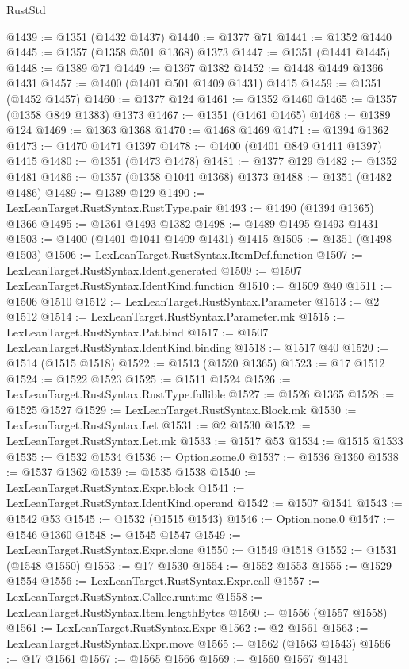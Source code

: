 \begin{lexlean}{RustStd}
\begin{coremodule}
@1439 := @1351 (@1432 @1437)
@1440 := @1377 @71
@1441 := @1352 @1440
@1445 := @1357 (@1358 @501 @1368) @1373
@1447 := @1351 (@1441 @1445)
@1448 := @1389 @71
@1449 := @1367 @1382
@1452 := @1448 @1449 @1366 @1431
@1457 := @1400 (@1401 @501 @1409 @1431) @1415
@1459 := @1351 (@1452 @1457)
@1460 := @1377 @124
@1461 := @1352 @1460
@1465 := @1357 (@1358 @849 @1383) @1373
@1467 := @1351 (@1461 @1465)
@1468 := @1389 @124
@1469 := @1363 @1368
@1470 := @1468 @1469
@1471 := @1394 @1362
@1473 := @1470 @1471 @1397
@1478 := @1400 (@1401 @849 @1411 @1397) @1415
@1480 := @1351 (@1473 @1478)
@1481 := @1377 @129
@1482 := @1352 @1481
@1486 := @1357 (@1358 @1041 @1368) @1373
@1488 := @1351 (@1482 @1486)
@1489 := @1389 @129
@1490 := LexLeanTarget.RustSyntax.RustType.pair
@1493 := @1490 (@1394 @1365) @1366
@1495 := @1361 @1493 @1382
@1498 := @1489 @1495 @1493 @1431
@1503 := @1400 (@1401 @1041 @1409 @1431) @1415
@1505 := @1351 (@1498 @1503)
@1506 := LexLeanTarget.RustSyntax.ItemDef.function
@1507 := LexLeanTarget.RustSyntax.Ident.generated
@1509 := @1507 LexLeanTarget.RustSyntax.IdentKind.function
@1510 := @1509 @40
@1511 := @1506 @1510
@1512 := LexLeanTarget.RustSyntax.Parameter
@1513 := @2 @1512
@1514 := LexLeanTarget.RustSyntax.Parameter.mk
@1515 := LexLeanTarget.RustSyntax.Pat.bind
@1517 := @1507 LexLeanTarget.RustSyntax.IdentKind.binding
@1518 := @1517 @40
@1520 := @1514 (@1515 @1518)
@1522 := @1513 (@1520 @1365)
@1523 := @17 @1512
@1524 := @1522 @1523
@1525 := @1511 @1524
@1526 := LexLeanTarget.RustSyntax.RustType.fallible
@1527 := @1526 @1365
@1528 := @1525 @1527
@1529 := LexLeanTarget.RustSyntax.Block.mk
@1530 := LexLeanTarget.RustSyntax.Let
@1531 := @2 @1530
@1532 := LexLeanTarget.RustSyntax.Let.mk
@1533 := @1517 @53
@1534 := @1515 @1533
@1535 := @1532 @1534
@1536 := Option.some.{0}
@1537 := @1536 @1360
@1538 := @1537 @1362
@1539 := @1535 @1538
@1540 := LexLeanTarget.RustSyntax.Expr.block
@1541 := LexLeanTarget.RustSyntax.IdentKind.operand
@1542 := @1507 @1541
@1543 := @1542 @53
@1545 := @1532 (@1515 @1543)
@1546 := Option.none.{0}
@1547 := @1546 @1360
@1548 := @1545 @1547
@1549 := LexLeanTarget.RustSyntax.Expr.clone
@1550 := @1549 @1518
@1552 := @1531 (@1548 @1550)
@1553 := @17 @1530
@1554 := @1552 @1553
@1555 := @1529 @1554
@1556 := LexLeanTarget.RustSyntax.Expr.call
@1557 := LexLeanTarget.RustSyntax.Callee.runtime
@1558 := LexLeanTarget.RustSyntax.Item.lengthBytes
@1560 := @1556 (@1557 @1558)
@1561 := LexLeanTarget.RustSyntax.Expr
@1562 := @2 @1561
@1563 := LexLeanTarget.RustSyntax.Expr.move
@1565 := @1562 (@1563 @1543)
@1566 := @17 @1561
@1567 := @1565 @1566
@1569 := @1560 @1567 @1431

\end{coremodule}
\end{lexlean}
